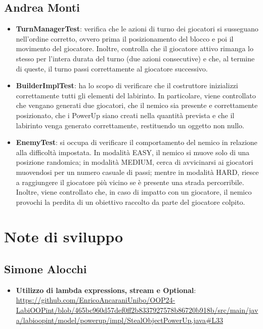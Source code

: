 \documentclass[a4paper,12pt]{report}
\begin{document}
\subsection{Andrea Monti}
\begin{itemize}
	\item \textbf{TurnManagerTest}: verifica che le azioni di turno dei giocatori si susseguano nell’ordine corretto, 
	ovvero prima il posizionamento del blocco e poi il movimento del giocatore. 
	Inoltre, controlla che il giocatore attivo rimanga lo stesso per l’intera durata del turno (due azioni consecutive) e 
	che, al termine di queste, il turno passi correttamente al giocatore successivo.
	\item \textbf{BuilderImplTest}: ha lo scopo di verificare che il costruttore inizializzi correttamente 
	tutti gli elementi del labirinto. In particolare, viene controllato che vengano generati due giocatori, che il nemico 
	sia presente e correttamente posizionato, che i PowerUp siano creati nella quantità prevista e che il labirinto venga 
	generato correttamente, restituendo un oggetto non nullo.
	\item \textbf{EnemyTest}: si occupa di verificare il comportamento del nemico in relazione alla difficoltà impostata. In modalità
	EASY, il nemico si muove solo di una posizione randomica; in modalità MEDIUM, cerca di avvicinarsi ai 
	giocatori muovendosi per un numero casuale di passi; mentre in modalità HARD, riesce a raggiungere il giocatore più vicino se è 
	presente una strada percorribile. Inoltre, viene controllato che, in caso di impatto con un giocatore, il nemico provochi 
	la perdita di un obiettivo raccolto da parte del giocatore colpito.
\end{itemize}


\newpage
\section{Note di sviluppo}
\subsection{Simone Alocchi}
\begin{itemize}
	\item \textbf{Utilizzo di lambda expressions, stream e Optional}: \url{https://github.com/EnricoAncaraniUnibo/OOP24-LabiOOPint/blob/465bc960d57def0ff2b8337927578b86720b918b/src/main/java/labioopint/model/powerup/impl/StealObjectPowerUp.java#L33}
\end{itemize}
\end{document}

